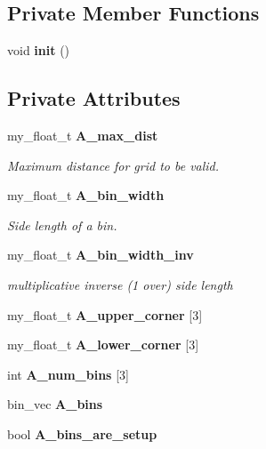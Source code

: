 \subsection*{Private Member Functions}
\begin{CompactItemize}
\item 
void \textbf{init} ()\label{classASCbase_1_1geometry_1_1DistanceArray_2750d605e1e1559a1af94773627ebf7e}

\end{CompactItemize}
\subsection*{Private Attributes}
\begin{CompactItemize}
\item 
my\_\-float\_\-t \bf{A\_\-max\_\-dist}\label{classASCbase_1_1geometry_1_1DistanceArray_8d48a1538dbd9906eb57f4ee7b366c66}

\begin{CompactList}\small\item\em Maximum distance for grid to be valid. \item\end{CompactList}\item 
my\_\-float\_\-t \bf{A\_\-bin\_\-width}\label{classASCbase_1_1geometry_1_1DistanceArray_3db71eff2a24debe8bbcfae462759b76}

\begin{CompactList}\small\item\em Side length of a bin. \item\end{CompactList}\item 
my\_\-float\_\-t \bf{A\_\-bin\_\-width\_\-inv}\label{classASCbase_1_1geometry_1_1DistanceArray_87ff0d438ee6643277aa4264f450cd0c}

\begin{CompactList}\small\item\em multiplicative inverse (1 over) side length \item\end{CompactList}\item 
my\_\-float\_\-t \textbf{A\_\-upper\_\-corner} [3]\label{classASCbase_1_1geometry_1_1DistanceArray_01a14247bcabaecf8e917b8aa5acf65a}

\item 
my\_\-float\_\-t \textbf{A\_\-lower\_\-corner} [3]\label{classASCbase_1_1geometry_1_1DistanceArray_8e955d0b3ebfb53e2ca6c19ee8983a29}

\item 
int \textbf{A\_\-num\_\-bins} [3]\label{classASCbase_1_1geometry_1_1DistanceArray_fbbb787940946323d4451b72fcedbfcf}

\item 
bin\_\-vec \textbf{A\_\-bins}\label{classASCbase_1_1geometry_1_1DistanceArray_d1d1803122cc7bfd7cce80e64afe297e}

\item 
bool \textbf{A\_\-bins\_\-are\_\-setup}\label{classASCbase_1_1geometry_1_1DistanceArray_2d5a5de8383858eddee83da5ad46887e}

\end{CompactItemize}


